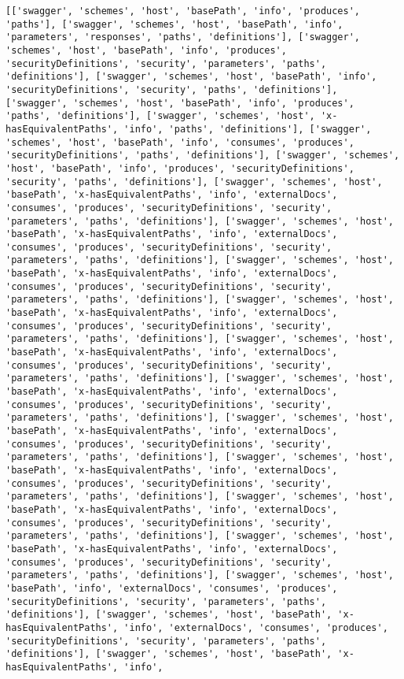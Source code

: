\documentclass[11pt]{article}
\begin{document}
    \begin{Verbatim}[commandchars=\\\{\}]
[['swagger', 'schemes', 'host', 'basePath', 'info', 'produces', 'paths'], ['swagger', 'schemes', 'host', 'basePath', 'info', 'parameters', 'responses', 'paths', 'definitions'], ['swagger', 'schemes', 'host', 'basePath', 'info', 'produces', 'securityDefinitions', 'security', 'parameters', 'paths', 'definitions'], ['swagger', 'schemes', 'host', 'basePath', 'info', 'securityDefinitions', 'security', 'paths', 'definitions'], ['swagger', 'schemes', 'host', 'basePath', 'info', 'produces', 'paths', 'definitions'], ['swagger', 'schemes', 'host', 'x-hasEquivalentPaths', 'info', 'paths', 'definitions'], ['swagger', 'schemes', 'host', 'basePath', 'info', 'consumes', 'produces', 'securityDefinitions', 'paths', 'definitions'], ['swagger', 'schemes', 'host', 'basePath', 'info', 'produces', 'securityDefinitions', 'security', 'paths', 'definitions'], ['swagger', 'schemes', 'host', 'basePath', 'x-hasEquivalentPaths', 'info', 'externalDocs', 'consumes', 'produces', 'securityDefinitions', 'security', 'parameters', 'paths', 'definitions'], ['swagger', 'schemes', 'host', 'basePath', 'x-hasEquivalentPaths', 'info', 'externalDocs', 'consumes', 'produces', 'securityDefinitions', 'security', 'parameters', 'paths', 'definitions'], ['swagger', 'schemes', 'host', 'basePath', 'x-hasEquivalentPaths', 'info', 'externalDocs', 'consumes', 'produces', 'securityDefinitions', 'security', 'parameters', 'paths', 'definitions'], ['swagger', 'schemes', 'host', 'basePath', 'x-hasEquivalentPaths', 'info', 'externalDocs', 'consumes', 'produces', 'securityDefinitions', 'security', 'parameters', 'paths', 'definitions'], ['swagger', 'schemes', 'host', 'basePath', 'x-hasEquivalentPaths', 'info', 'externalDocs', 'consumes', 'produces', 'securityDefinitions', 'security', 'parameters', 'paths', 'definitions'], ['swagger', 'schemes', 'host', 'basePath', 'x-hasEquivalentPaths', 'info', 'externalDocs', 'consumes', 'produces', 'securityDefinitions', 'security', 'parameters', 'paths', 'definitions'], ['swagger', 'schemes', 'host', 'basePath', 'x-hasEquivalentPaths', 'info', 'externalDocs', 'consumes', 'produces', 'securityDefinitions', 'security', 'parameters', 'paths', 'definitions'], ['swagger', 'schemes', 'host', 'basePath', 'x-hasEquivalentPaths', 'info', 'externalDocs', 'consumes', 'produces', 'securityDefinitions', 'security', 'parameters', 'paths', 'definitions'], ['swagger', 'schemes', 'host', 'basePath', 'x-hasEquivalentPaths', 'info', 'externalDocs', 'consumes', 'produces', 'securityDefinitions', 'security', 'parameters', 'paths', 'definitions'], ['swagger', 'schemes', 'host', 'basePath', 'x-hasEquivalentPaths', 'info', 'externalDocs', 'consumes', 'produces', 'securityDefinitions', 'security', 'parameters', 'paths', 'definitions'], ['swagger', 'schemes', 'host', 'basePath', 'info', 'externalDocs', 'consumes', 'produces', 'securityDefinitions', 'security', 'parameters', 'paths', 'definitions'], ['swagger', 'schemes', 'host', 'basePath', 'x-hasEquivalentPaths', 'info', 'externalDocs', 'consumes', 'produces', 'securityDefinitions', 'security', 'parameters', 'paths', 'definitions'], ['swagger', 'schemes', 'host', 'basePath', 'x-hasEquivalentPaths', 'info', 
\end{Verbatim}
\end{document}
